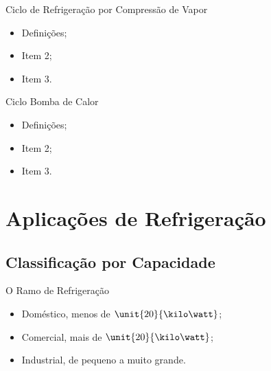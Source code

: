     \begin{frame}{Ciclo de Refrigeração por Compressão de Vapor}\vspace*{-0em}
        \begin{itemize}
            \item<1-> Definições;
            \item<1-> Item 2;
            \item<1-> Item 3.
        \end{itemize}
    \end{frame}

    \begin{frame}{Ciclo Bomba de Calor}\vspace*{-0em}
        \begin{itemize}
            \item<1-> Definições;
            \item<1-> Item 2;
            \item<1-> Item 3.
        \end{itemize}
    \end{frame}

\section{Aplicações de Refrigeração}

\subsection{Classificação por Capacidade}

    \begin{frame}{O Ramo de Refrigeração}\vspace*{-0em}
        \begin{itemize}
            \item<1-> Doméstico, \alert{menos de $\unit{20}{\kilo\watt}$};
            \item<2-> Comercial, \alert{mais de $\unit{20}{\kilo\watt}$};
            \item<3-> Industrial, \alert{de pequeno a muito grande}.
        \end{itemize}
    \end{frame}

